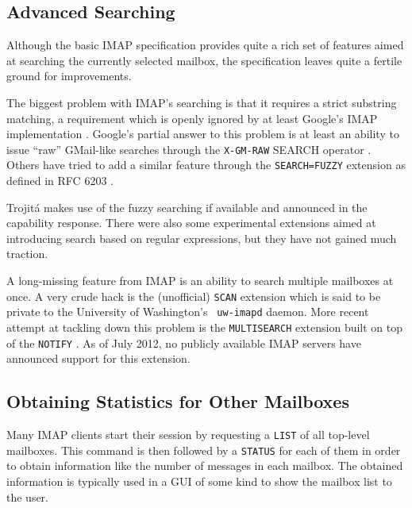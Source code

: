 \documentclass[trojita]{subfiles}
\begin{document}
\subsection{Advanced Searching}

Although the basic IMAP specification provides quite a rich set of features aimed at searching the currently selected
mailbox, the specification leaves quite a fertile ground for improvements.

The biggest problem with IMAP's searching is that it requires a strict substring matching, a requirement which is openly
ignored by at least Google's IMAP implementation \cite{gmail-imap-unsupported-features}.  Google's partial answer to
this problem is at least an ability to issue ``raw'' GMail-like searches through the {\tt X-GM-RAW} SEARCH operator
\cite{gmail-x-gm-raw}.  Others have tried to add a similar feature through the {\tt SEARCH=FUZZY} extension as defined
in RFC 6203 \cite{rfc6203}.

\begin{trojitabehavior}
Trojitá makes use of the fuzzy searching if available and announced in the capability response.  There were also some
experimental extensions \cite{draft-ietf-imapext-regex} aimed at introducing search based on regular expressions, but
they have not gained much traction.
\end{trojitabehavior}

A long-missing feature from IMAP is an ability to search multiple mailboxes at once.  A very crude hack is the
(unofficial) {\tt SCAN} extension \cite{crispin-scan} which is said to be private to the University of Washington's {\tt
uw-imapd} daemon.  More recent attempt at tackling down this problem is the {\tt MULTISEARCH} extension \cite{rfc6237}
built on top of the {\tt NOTIFY} \cite{rfc5465}.  As of July 2012, no publicly available IMAP servers have announced
support for this extension.

\subsection{Obtaining Statistics for Other Mailboxes}

Many IMAP clients start their session by requesting a {\tt LIST} of all top-level mailboxes.  This command is then
followed by a {\tt STATUS} for each of them in order to obtain information like the number of messages in each mailbox.
The obtained information is typically used in a GUI of some kind to show the mailbox list to the user.
\end{document}
